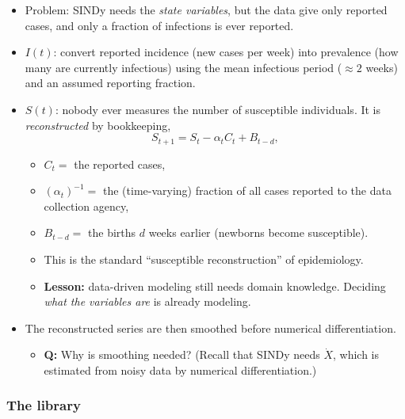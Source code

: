 \documentclass[20pt]{extarticle}
\begin{document}
\begin{itemize}
\item Problem: SINDy needs the \emph{state variables}, but the data give only reported cases, and only a fraction of infections is ever reported.
\item $I(t)$: convert reported incidence (new cases per week) into prevalence (how many are currently infectious) using the mean infectious period ($\approx 2$ weeks) and an assumed reporting fraction.
\item $S(t)$: nobody ever measures the number of susceptible individuals. It is \emph{reconstructed} by bookkeeping,
\[ S_{t+1} = S_t - \alpha_t C_{t} + B_{t-d}, \]
	\begin{itemize}
	\item $C_t =$ the reported cases,
	\item $(\alpha_t)^{-1} =$ the (time-varying) fraction of all cases reported to the data collection agency,
	\item $B_{t-d} =$ the births $d$ weeks earlier (newborns become susceptible).
	\item This is the standard ``susceptible reconstruction'' of epidemiology.
	\item \textbf{Lesson:} data-driven modeling still needs domain knowledge. Deciding \emph{what the variables are} is already modeling.
	\end{itemize}
\item The reconstructed series are then smoothed before numerical differentiation.
	\begin{itemize}
	\item \textbf{Q:} Why is smoothing needed? (Recall that SINDy needs $\dot{X}$, which is estimated from noisy data by numerical differentiation.)
	\end{itemize}
\end{itemize}

\subsubsection*{The library}
\end{document}
